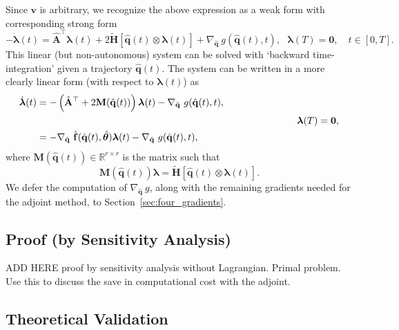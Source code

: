Since $\mathbf{v}$ is arbitrary, we recognize the above expression as a weak form with corresponding strong form\\
\begin{equation*}
    -\dot{\bm{\lambda}}(t) = \hat{\mathbf{A}}^{\top} \bm{\lambda}(t) + 2\tilde{\mathbf{H}}[\hat{\mathbf{q}}(t)\otimes \bm{\lambda}(t)] + \nabla_{\hat{\mathbf{q}}}~g(\hat{\mathbf{q}}(t),t),~~~\bm{\lambda}(T)=\bm{0},\quad t\in [0,T].
\end{equation*}
This linear (but non-autonomous) system can be solved with `backward time-integration' given a trajectory $\hat{\mathbf{q}}(t)$. The system can be written in a more clearly linear form (with respect to $\bm{\lambda}(t)$) as\\
\begin{align*}
     \dot{\bm{\lambda}}(t) &= -\left(\hat{\mathbf{A}}^{\top} + 2\mathbf{M}(\hat{\mathbf{q}}(t))\right)\bm{\lambda}(t) - \nabla_{\hat{\mathbf{q}}}~g(\hat{\mathbf{q}}(t),t),\\
    &~\hspace{8.8cm}~~~~~\bm{\lambda}(T)=\bm{0},\\
    &= -\nabla_{\hat{\mathbf{q}}}~\hat{\mathbf{f}}(\hat{\mathbf{q}}(t),\hat{\bm{\theta}})\bm{\lambda}(t) - \nabla_{\hat{\mathbf{q}}}~g(\hat{\mathbf{q}}(t),t),
\end{align*}
where $\mathbf{M}(\hat{\mathbf{q}}(t))\in\mathbb{R}^{r\times r}$ is the matrix such that\\
\begin{equation*}
    \mathbf{M}(\hat{\mathbf{q}}(t)) \bm{\lambda} = \tilde{\mathbf{H}}[\hat{\mathbf{q}}(t)\otimes \bm{\lambda}(t)].
\end{equation*}
We defer the computation of $\nabla_{\hat{\mathbf{q}}}~g$, along with the remaining gradients needed for the adjoint method, to Section~\ref{sec:four_gradients}.




\subsection*{Proof (by Sensitivity Analysis)}

ADD HERE proof by sensitivity analysis without Lagrangian. Primal problem. Use this to discuss the save in computational cost with the adjoint.


\subsection*{Theoretical Validation}

